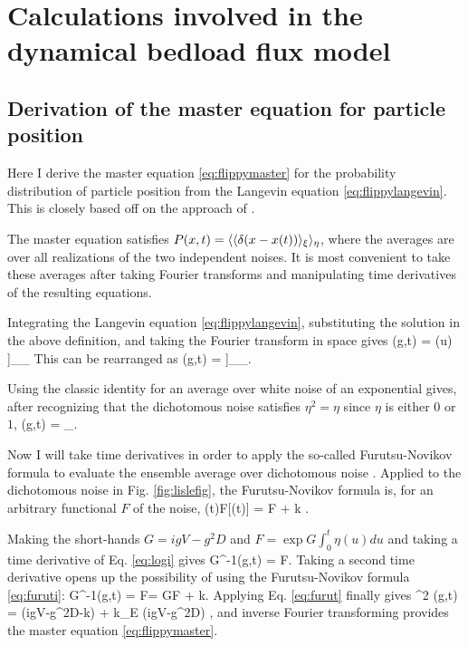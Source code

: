 
\chapter{Calculations involved in the dynamical bedload flux model}
\label{sec:appendixAfluc}
\section{Derivation of the master equation for particle position}
\label{sec:appAmaster}
Here I derive the master equation \ref{eq:flippymaster} for the probability distribution of particle position from the Langevin equation \ref{eq:flippylangevin}. This is closely based off on the approach of \citet{Balakrishnan1993}.

The master equation satisfies $P(x,t) = \langle\langle \delta(x-x(t))\rangle_\xi \rangle_\eta$, where the averages are over all realizations of the two independent noises. It is most convenient to take these averages after taking Fourier transforms and manipulating time derivatives of the resulting equations.

Integrating the Langevin equation \ref{eq:flippylangevin}, substituting the solution in the above definition, and taking the Fourier transform in space gives
\be {}(g,t) = \Big\bra  \Big\bra \exp \Big[- i g \int_0^t du [V+\sqrt{2D}\xi(u)]\eta(u) \Big]\Big\ket_\eta \Big\ket_\xi\ee
This can be rearranged as
\be {}(g,t) = \Big\bra \exp{} \Big\bra \exp{}\Big]\Big\ket_\xi \Big\ket_\eta .\ee

Using the classic identity for an average over white noise of an exponential \citep{Balakrishnan1993,VanKampen2007} gives, after recognizing that the dichotomous noise satisfies $\eta^2 = \eta$ since $\eta$ is either $0$ or $1$,
\be {}(g,t) = \Big\bra \exp{}\Big\ket_\eta. \label{eq:logi}\ee

Now I will take time derivatives in order to apply the so-called Furutsu-Novikov formula to evaluate the ensemble average over dichotomous noise \citep{Shapiro1978}. Applied to the dichotomous noise in Fig. \ref{fig:lislefig}, the Furutsu-Novikov formula is, for an arbitrary functional $F$ of the noise,
\be \pt \bra \eta(t)F[\eta(t)] \ket = \bra \eta \pt F \ket + k   \label{eq:furuti}.\ee


Making the short-hands $G = igV-g^2D$ and $F=\exp G\int_0^t \eta(u)du$ and taking a time derivative of Eq. \ref{eq:logi} gives
\be G^{-1}\pt {}(g,t) = \bra \eta F\ket. \label{eq:furut}\ee
Taking a second time derivative opens up the possibility of using the Furutsu-Novikov formula \ref{eq:furuti}: 
\be G^{-1}\pt {}(g,t) = \pt \bra \eta F\ket = G\bra \eta F \ket + k. \ee
Applying Eq. \ref{eq:furut} finally gives
\be \pt^2 (g,t)  = (igV-g^2D-k)\pt  {} + k_E (igV-g^2D) ,\ee
and inverse Fourier transforming provides the master equation \ref{eq:flippymaster}.

